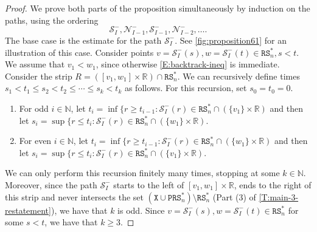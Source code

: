 \documentclass[11pt,twoside]{amsart}
\theoremstyle{plain}
\numberwithin{quest}{section}
\theoremstyle{remark}
\numberwithin{rem}{section}
\theoremstyle{definition}
\newcommand{\N}{\mathbb{N}}
\newcommand{\R}{\mathbb{R}}
\newcommand{\cS}{\mathcal{S}}
\newcommand{\cN}{\mathcal{N}}
\renewcommand{\tt}[1]{{\mathtt{#1}}}
\begin{document}
	\begin{proof}
		We prove both parts of the proposition simultaneously by induction on the paths, using the ordering
		$$
	\cS_I^- , \cN_{I-1}^-, \cS_{I-1}^-, \cN_{I-2}^-, \dots.
	$$
	The base case is the estimate for the path $\cS_I^-$. See \cref{fig:proposition61} for an illustration of this case. Consider points $v = \cS_{I}^-(s), w = \cS_{I}^-(t)  \in \tt{RS}_n^*, s < t$. We assume that $v_1 < w_1$, since otherwise \eqref{E:backtrack-ineq} is immediate. Consider the strip $R = ([v_1, w_1] \times \R) \cap \tt{RS}_n^*$. We can recursively define times $s_1 < t_1 \le s_2 < t_2 \le \cdots \le s_k < t_k$ as follows. For this recursion, set $s_0 = t_0 = 0$.
    \begin{enumerate}[label=\arabic*.]
        \item For odd $i \in \N$, let $t_i = \inf \{r \ge t_{i-1} : \cS_I^-(r) \in \tt{RS}_n^* \cap  (\{v_1\} \times \R)$ and then let $s_i = \sup \{r \le t_i : \cS_I^-(r) \in \tt{RS}_n^* \cap  (\{w_1\} \times \R)$.
        \item For even $i \in \N$, let $t_i = \inf \{r \ge t_{i-1} : \cS_I^-(r) \in \tt{RS}_n^* \cap  (\{w_1\} \times \R)$ and then let $s_i = \sup \{r \le t_i : \cS_I^-(r) \in \tt{RS}_n^* \cap (\{v_1\} \times \R)$.
    \end{enumerate}
    We can only perform this recursion finitely many times, stopping at some $k \in \N$. Moreover, since the path $\cS_I^-$  starts to the left of $[v_1, w_1] \times \R$, ends to the right of this strip and never intersects the set $(\tt{X} \cup \tt{PRS}^*_n)\setminus \tt{RS}^*_n$ (Part (3) of \cref{T:main-3-restatement}), we have that $k$ is odd. Since $v = \cS_{I}^-(s), w = \cS_{I}^-(t)  \in \tt{RS}_n^*$ for some $s < t$, we have that $k \ge 3$.
    

\end{proof}
\end{document}
